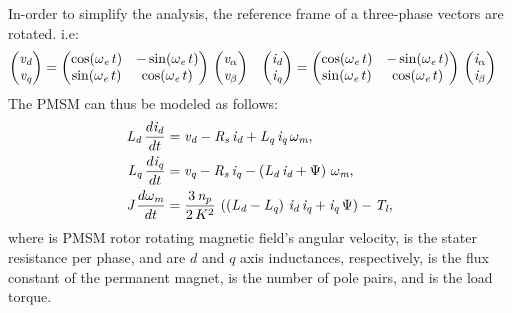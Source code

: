 In-order to simplify the analysis, the reference frame of a three-phase vectors are rotated. i.e:
\begin{align*}
	\begin{pmatrix}
			\vd \\
			\vq
	\end{pmatrix} &= \begin{pmatrix}
						\cos(\we\,t) & -\sin(\we\,t) \\
						\sin(\we\,t) & \cos(\we\,t) \\
					 \end{pmatrix}\, \begin{pmatrix}
										 \valpha \\
										 \vbeta
									 \end{pmatrix} & \begin{pmatrix}
									 \id \\
									 \iq
								 \end{pmatrix} &= \begin{pmatrix}
								 \cos(\we\,t) & -\sin(\we\,t) \\
								 \sin(\we\,t) & \cos(\we\,t) \\
							 \end{pmatrix}\, \begin{pmatrix}
							 \ialpha \\
							 \ibeta
						 \end{pmatrix}
\end{align*}
The PMSM can thus be modeled as follows:
\begin{align*}
	\Ld\,\frac{d\id}{dt} &= \vd - \Rs\,\id + \Lq\,\iq\,\wm,\\
	\Lq\,\frac{d\iq}{dt} &= \vq - \Rs\,\iq - \left(\Ld\,\id + \flux\right)\,\wm,\\
	\J\,\frac{d\wm}{dt} &= \frac{3\,\np}{2\,K^2}\,\left(\left(\Ld - \Lq\right)\,\id\,\iq + \iq\,\flux\right) - \Tl,
\end{align*}
where \wm is PMSM rotor rotating magnetic field's angular velocity, \Rs is the stater resistance per phase, \Ld and \Lq are $d$ and $q$ axis inductances, respectively, \flux is the flux constant of the permanent magnet, \np is the number of pole pairs, and \Tl is the load torque. 


